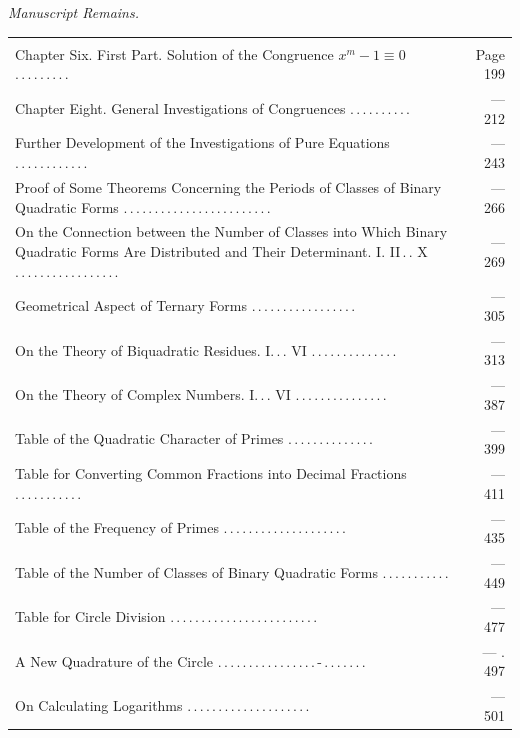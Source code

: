 \par\medskip{}\textit{Manuscript Remains.}
\begingroup\fontsize{10}{13}\selectfont
\begin{longtable}{@{}>{\raggedright\arraybackslash}p{.86\linewidth}@{\quad}r@{}}
\multicolumn{2}{@{}l}{Analysis of Residues:}\\[3pt]
Chapter Six. First Part. Solution of the Congruence $x^m-1\equiv0$ .\,.\,.\,.\,.\,.\,.\,.\,. & Page 199 \\[3pt]
Chapter Eight. General Investigations of Congruences .\,.\,.\,.\,.\,.\,.\,.\,.\,. & — 212 \\[3pt]
Further Development of the Investigations of Pure Equations .\,.\,.\,.\,.\,.\,.\,.\,.\,.\,.\,. & — 243 \\[3pt]
Proof of Some Theorems Concerning the Periods of Classes of Binary Quadratic Forms .\,.\,.\,.\,.\,.\,.\,.\,.\,.\,.\,.\,.\,.\,.\,.\,.\,.\,.\,.\,.\,.\,.\,. & — 266 \\[3pt]
On the Connection between the Number of Classes into Which Binary Quadratic Forms Are Distributed and Their Determinant. I. II\,.\,. X .\,.\,.\,.\,.\,.\,.\,.\,.\,.\,.\,.\,.\,.\,.\,.\,. & — 269 \\[3pt]
Geometrical Aspect of Ternary Forms .\,.\,.\,.\,.\,.\,.\,.\,.\,.\,.\,.\,.\,.\,.\,.\,. & — 305 \\[3pt]
On the Theory of Biquadratic Residues. I.\,.\,. VI .\,.\,.\,.\,.\,.\,.\,.\,.\,.\,.\,.\,.\,. & — 313 \\[3pt]
On the Theory of Complex Numbers. I.\,.\,. VI .\,.\,.\,.\,.\,.\,.\,.\,.\,.\,.\,.\,.\,.\,. & — 387 \\[3pt]
Table of the Quadratic Character of Primes .\,.\,.\,.\,.\,.\,.\,.\,.\,.\,.\,.\,.\,. & — 399 \\[3pt]
Table for Converting Common Fractions into Decimal Fractions .\,.\,.\,.\,.\,.\,.\,.\,.\,.\,. & — 411 \\[3pt]
Table of the Frequency of Primes .\,.\,.\,.\,.\,.\,.\,.\,.\,.\,.\,.\,.\,.\,.\,.\,.\,.\,.\,. & — 435 \\[3pt]
Table of the Number of Classes of Binary Quadratic Forms .\,.\,.\,.\,.\,.\,.\,.\,.\,.\,. & — 449 \\[3pt]
Table for Circle Division .\,.\,.\,.\,.\,.\,.\,.\,.\,.\,.\,.\,.\,.\,.\,.\,.\,.\,.\,.\,.\,.\,.\,. & — 477 \\[3pt]
A New Quadrature of the Circle .\,.\,.\,.\,.\,.\,.\,.\,.\,.\,.\,.\,.\,.\,.\,.\,-\,.\,.\,.\,.\,.\,.\,. & — . 497 \\[3pt]
On Calculating Logarithms .\,.\,.\,.\,.\,.\,.\,.\,.\,.\,.\,.\,.\,.\,.\,.\,.\,.\,.\,. & — 501 \\[3pt]

\end{longtable}
